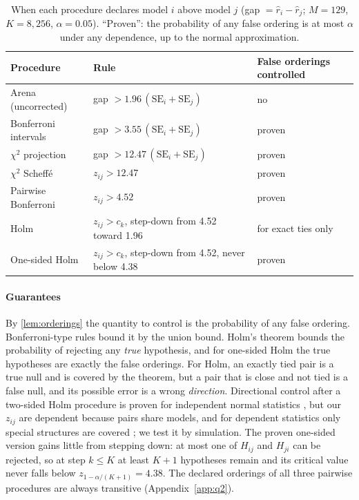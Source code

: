 \documentclass[12pt]{article}
\newcommand{\SE}{\mathrm{SE}}
\begin{document}
\begin{table}[t]
\centering\footnotesize
\caption{When each procedure declares model $i$ above model $j$ (gap $= \hat r_i - \hat r_j$; $M = 129$, $K = 8{,}256$, $\alpha = 0.05$). ``Proven'': the probability of any false ordering is at most $\alpha$ under any dependence, up to the normal approximation.}\label{tab:procs}
\begin{tabular}{@{}lll@{}}
\toprule
Procedure & Rule & False orderings controlled \\
\midrule
Arena (uncorrected) & gap $> 1.96\,(\SE_i + \SE_j)$ & no \\
Bonferroni intervals & gap $> 3.55\,(\SE_i + \SE_j)$ & proven \\
$\chi^2$ projection & gap $> 12.47\,(\SE_i + \SE_j)$ & proven \\
$\chi^2$ Scheff\'e & $z_{ij} > 12.47$ & proven \\
Pairwise Bonferroni & $z_{ij} > 4.52$ & proven \\
Holm & $z_{ij} > c_k$, step-down from 4.52 toward 1.96 & for exact ties only \\
One-sided Holm & $z_{ij} > c_k$, step-down from 4.52, never below 4.38 & proven \\
\bottomrule
\end{tabular}
\end{table}

\paragraph{Guarantees} By \cref{lem:orderings} the quantity to control is the probability of any false ordering. Bonferroni-type rules bound it by the union bound. Holm's theorem bounds the probability of rejecting any \emph{true} hypothesis, and for one-sided Holm the true hypotheses are exactly the false orderings. For Holm, an exactly tied pair is a true null and is covered by the theorem, but a pair that is close and not tied is a false null, and its possible error is a wrong \emph{direction}. Directional control after a two-sided Holm procedure is proven for independent normal statistics \citep{shaffer1980control}, but our $z_{ij}$ are dependent because pairs share models, and for dependent statistics only special structures are covered \citep{finner1999stepwise, guo2016directional}; we test it by simulation. The proven one-sided version gains little from stepping down: at most one of $H_{ij}$ and $H_{ji}$ can be rejected, so at step $k \le K$ at least $K + 1$ hypotheses remain and its critical value never falls below $z_{1-\alpha/(K+1)} = 4.38$. The declared orderings of all three pairwise procedures are always transitive (Appendix~\ref{app:q2}).
\end{document}
